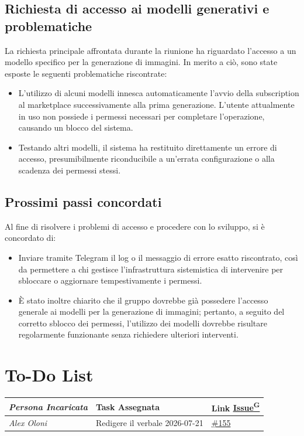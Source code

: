 \documentclass[a4paper,12pt]{article}
\providecommand{\glslink}[2]{\href{https://alittlebyte-19.github.io/Documentazione/glossario.html\#gls-#1}{\underline{#2}\textsuperscript{\scriptsize G}}}
\begin{document}
\subsection{Richiesta di accesso ai modelli generativi e problematiche}
La richiesta principale affrontata durante la riunione ha riguardato l'accesso a un modello specifico per la generazione di immagini. In merito a ciò, sono state esposte le seguenti problematiche riscontrate:\begin{itemize}
    \item L'utilizzo di alcuni modelli innesca automaticamente l'avvio della subscription al marketplace successivamente alla prima generazione. L'utente attualmente in uso non possiede i permessi necessari per completare l'operazione, causando un blocco del sistema.
    \item Testando altri modelli, il sistema ha restituito direttamente un errore di accesso, presumibilmente riconducibile a un'errata configurazione o alla scadenza dei permessi stessi.
   \end{itemize}

\subsection{Prossimi passi concordati}
Al fine di risolvere i problemi di accesso e procedere con lo sviluppo, si è concordato di:
\begin{itemize}
    \item Inviare tramite Telegram il log o il messaggio di errore esatto riscontrato, così da permettere a chi gestisce l'infrastruttura sistemistica di intervenire per sbloccare o aggiornare tempestivamente i permessi.
    \item È stato inoltre chiarito che il gruppo dovrebbe già possedere l'accesso generale ai modelli per la generazione di immagini; pertanto, a seguito del corretto sblocco dei permessi, l'utilizzo dei modelli dovrebbe risultare regolarmente funzionante senza richiedere ulteriori interventi.
\end{itemize}
\section{To-Do List}
\begin{table}[h]
    \centering
    \begin{tabular}{|p{4.5cm}|p{5cm}|l|}
    \hline
        \rowcolor{lightgray}\textit{\textbf{Persona Incaricata}}  & \textbf{Task Assegnata} &\textbf{Link \glslink{issue}{Issue}} \\
    \hline
        \textit{Alex Oloni} & Redigere il verbale 2026-07-21 & \href{https://github.com/aLittleByte-19/Documentazione/issues/155}{\#155} \\
    \hline
    \end{tabular}
    \label{tab:placeholder}
\end{table}
\end{document}

